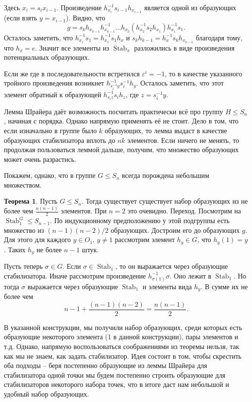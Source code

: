 \documentclass[10pt,a4paper,oneside]{book}
\theoremstyle{definition}
\newtheorem{thm}{\color{red!40!black}Теорема}
\renewcommand{\leq}{\leqslant}
\newcommand{\Stab}{\operatorname{Stab}}
\def\eps{\varepsilon}
\def\thrm{\begin{thm}}
\def\ethrm{\end{thm}}
\begin{document}
Здесь $x_i=s_i x_{i-1}$. Произведение $h_{x_i}^{-1}s_{i-1}h_{x_{i-1}}$ является одной из образующих (если взять $y=x_{i-1}$). Видно, что $$g=s_kh_{x_{k-1}}h_{x_{k-1}}^{-1}\dots h_{x_2} (h_{x_2}^{-1}s_2 h_{x_1})h_{x_1}^{-1}s_1.$$
Осталось заметить, что $h_{x_1}^{-1}s_1=h_{x_1}^{-1}s_1h_x$ и $s_k h_{k-1}=h_x^{-1}s_k h_{x_{k-1}}$ благодаря тому, что $h_x=e$. Значит все элементы из $\Stab_x$ разложились в виде произведения потенциальных образующих. 

Если же где в последовательности встретился $\eps^{i}=-1$, то в качестве указанного тройного произведения возникнет $h^{-1}_{s_i^{-1}y} s_i^{-1} h_y$. Осталось заметить, что этот элемент обратный к образующей $h^{-1}_{s_iz}s_i h_z$, где $z=s_i^{-1}y$.

\endproof



Лемма Шрайера даёт возможность посчитать практически всё про группу $H \leq S_n$, начиная с порядка. Однако напрямую применять её не стоит. Дело в том, что если изначально в группе было $k$ образующих, то лемма выдаст в качестве образующих стабилизатора вплоть до $nk$ элементов. Если ничего не менять, то продолжая пользоваться леммой дальше,  получим, что множество образующих может очень разрастись. 

Покажем, однако, что в группе $G\leq S_n$ всегда порождена небольшим множеством.


\thrm Пусть $G\leq S_n$. Тогда существует существует набор образующих из не более чем $\frac{n(n-1)}{2}$ элементов.
\proof  При $n=2$ это очевидно. Переход. Посмотрим на $\Stab_{1}^G \leq S_{n-1}$. По индукционному предположению у этой подгруппы есть множество из $(n-1)(n-2)/2$ образующих. Достроим его до образующих $g$. Для этого для каждого $y\in O_{1},\, y\neq 1$ рассмотрим элемент $h_y\in G$, что $h_y(1)=y$. Таких $h_y$ не более $n-1$ штук.

Пусть теперь $\sigma \in G$. Если $\sigma \in \Stab_{1}$, то он выражается через образующие стабилизатора. Иначе рассмотрим произведение $h_{\sigma(1)}^{-1}\sigma$. Оно лежит в $\Stab_{1}$. Но тогда $\sigma$ выражается через образующие $\Stab_{1}$ и элементы вида $h_y$. В сумме их не более чем 
$$n-1+\frac{(n-1)(n-2)}{2}=\frac{n(n-1)}{2}.$$
\endproof
\ethrm

В указанной конструкции, мы получили набор образующих, среди которых есть образующие некоторого элемента (1 в данной конструкции), пары элементов и т.д. Однако, напрямую воспользоваться соображениями из теоремы нельзя, так как мы не знаем, как задать стабилизатор. Идея состоит в том, чтобы скрестить оба подходы -- беря постепенно образующие из леммы Шрайера для стабилизатора одной точки мы будем постепенно строить образующие для стабилизаторов некоторого набора точек, что  в итоге даст нам небольшой и удобный набор образующих.
\end{document}
